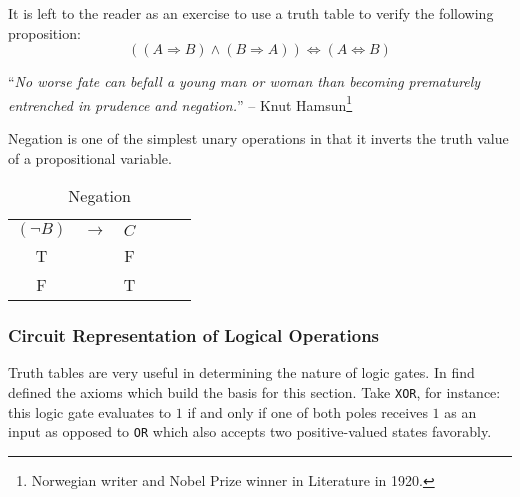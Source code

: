 \begin{exm}\label{exm-logical-equivalent}
    It is left to the reader as an exercise to use a truth table to verify the
    following proposition:
    \begin{equation}
        \left((A \Rightarrow B) \land (B \Rightarrow A)\right) \Leftrightarrow (A \Leftrightarrow B)
    \end{equation}
\end{exm}

\begin{displayquote}
    ``\emph{No worse fate can befall a young man or woman than becoming prematurely
    entrenched in prudence and negation.}''
    -- Knut Hamsun\footnote{Norwegian writer and Nobel Prize winner in Literature
    in 1920.}
\end{displayquote}

Negation is one of the simplest unary operations in that it inverts the truth
value of a propositional variable.

\begin{table}[hbt!]
    \centering
    \begin{tabular}{*{6}{c}}
        $(\neg B)$ & $\rightarrow$ & $C$ \\
                 T &               & F   \\
                 F &               & T   \\
    \end{tabular}
    \caption{Negation}\label{table-negation}
\end{table}


\subsubsection{Circuit Representation of Logical Operations}\label{subsubsec-circuit-representation}

Truth tables are very useful in determining the nature of logic gates.
In  find defined the axioms which build the basis
for this section. Take \texttt{XOR}, for instance: this logic gate evaluates to $1$
if and only if one of both poles receives $1$ as an input as opposed to \texttt{OR}
which also accepts two positive-valued states favorably.

